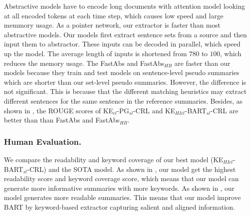 Abstractive models have to encode long documents with
attention model looking at all encoded tokens at each time step,
which causes low speed and large memmory usage.
As a pointer network, our extractor is faster than most abstractive models.
Our models first extract sentence sets from a source
and then input them to abstractor.
These inputs can be decoded in parallel, which speed up the model.
The average length of inputs is shortened from $780$ to $100$,
which reduces the memory usage.
The FastAbs and FastAbs$_{HB}$ are faster than our models because they train and test models on sentence-level pseudo summaries
which are shorter than our set-level pseudo summaries. However, the difference is not significant.
This is because that the different matching heuristics may extract different sentences for the same sentence in the reference summaries.
Besides, as shown in , the ROUGE scores of KE$_{cl}$-PG$_{sl}$-CRL and KE$_{HIcl}$-BART$_{sl}$-CRL are better than 
than FastAbs and FastAbs$_{HB}$.

\subsubsection{Human Evaluation.}
We compare the readability and keyword coverage of our best model
(KE$_{HIcl}$-BART$_{sl}$-CRL)
and the SOTA model.
As shown in , 
our model get the highest readability score and keyword coverage score,
which means that our model can generate more informative summaries with more keywords.
As shown in , 
our model generates
more readable summaries.
This means that our model improve BART by 
keyword-based extractor capturing salient and aligned information.


